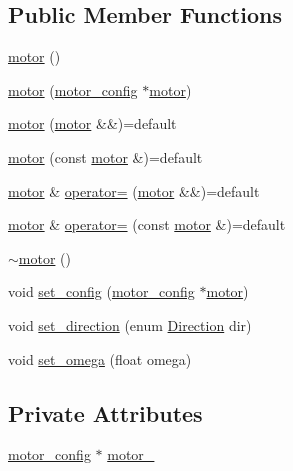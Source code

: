 \subsection*{Public Member Functions}
\begin{DoxyCompactItemize}
\item 
\mbox{\hyperlink{classmotor_aa844d5f5525d4074814c6eb442a5edee}{motor}} ()
\item 
\mbox{\hyperlink{classmotor_a9c01c3708164e16c70e1140011d308e4}{motor}} (\mbox{\hyperlink{structmotor__config}{motor\+\_\+config}} $\ast$\mbox{\hyperlink{classmotor}{motor}})
\item 
\mbox{\hyperlink{classmotor_a69ca4e0bdf735ca324b2a64a555613e6}{motor}} (\mbox{\hyperlink{classmotor}{motor}} \&\&)=default
\item 
\mbox{\hyperlink{classmotor_a95429da99ca065a6ba2dd9fd823a83f2}{motor}} (const \mbox{\hyperlink{classmotor}{motor}} \&)=default
\item 
\mbox{\hyperlink{classmotor}{motor}} \& \mbox{\hyperlink{classmotor_a56c0ac07ae4fe630290c25415f36f828}{operator=}} (\mbox{\hyperlink{classmotor}{motor}} \&\&)=default
\item 
\mbox{\hyperlink{classmotor}{motor}} \& \mbox{\hyperlink{classmotor_aaca163743034455779d02fd44e1c090e}{operator=}} (const \mbox{\hyperlink{classmotor}{motor}} \&)=default
\item 
\mbox{\hyperlink{classmotor_ae7c05cf12983ab16ecdfe8e34c4c7ffa}{$\sim$motor}} ()
\item 
void \mbox{\hyperlink{classmotor_a4580801b17e4b05384ab89ece8c3ca12}{set\+\_\+config}} (\mbox{\hyperlink{structmotor__config}{motor\+\_\+config}} $\ast$\mbox{\hyperlink{classmotor}{motor}})
\item 
void \mbox{\hyperlink{classmotor_a788528b29d950ce81e3e9a41eb1977a3}{set\+\_\+direction}} (enum \mbox{\hyperlink{motor_8h_a224b9163917ac32fc95a60d8c1eec3aa}{Direction}} dir)
\item 
void \mbox{\hyperlink{classmotor_aafd4845142b5d311ea73331b3ae1bb33}{set\+\_\+omega}} (float omega)
\end{DoxyCompactItemize}
\subsection*{Private Attributes}
\begin{DoxyCompactItemize}
\item 
\mbox{\hyperlink{structmotor__config}{motor\+\_\+config}} $\ast$ \mbox{\hyperlink{classmotor_ab02539b935506b27e47fe9ae15213ea7}{motor\+\_\+}}
\end{DoxyCompactItemize}


